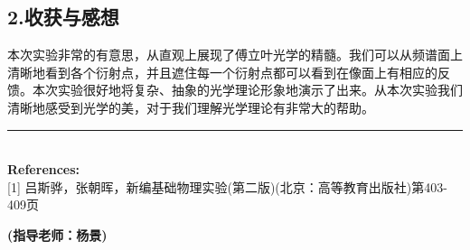 \documentclass[23pt,a4paper,two column]{article}
\begin{document}
\newpage



\subsection*{2.收获与感想}

本次实验非常的有意思，从直观上展现了傅立叶光学的精髓。我们可以从频谱面上清晰地看到各个衍射点，并且遮住每一个衍射点都可以看到在像面上有相应的反馈。本次实验很好地将复杂、抽象的光学理论形象地演示了出来。从本次实验我们清晰地感受到光学的美，对于我们理解光学理论有非常大的帮助。

\rule{\columnwidth}{0.13mm}\\

\noindent\textbf{References:}\\
\scriptsize {[1] 吕斯骅，张朝晖，新编基础物理实验(第二版)(北京：高等教育出版社)第403-409页}\\

\begin{flushright}
\large\textbf{(指导老师：杨景)}
\end{flushright}

\raggedend
\end{document}
